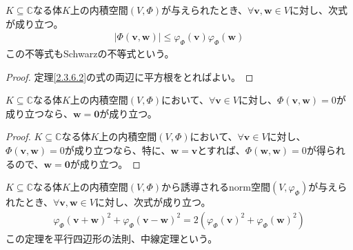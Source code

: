 \documentclass[dvipdfmx]{jsarticle}
\begin{document}
\begin{thm}[Schwarzの不等式の系]\label{2.3.6.4}
$K \subseteq \mathbb{C}$なる体$K$上の内積空間$(V,\varPhi)$が与えられたとき、$\forall\mathbf{v},\mathbf{w} \in V$に対し、次式が成り立つ。
\begin{align*}
\left| \varPhi\left( \mathbf{v},\mathbf{w} \right) \right| \leq \varphi_{\varPhi}\left( \mathbf{v} \right)\varphi_{\varPhi}\left( \mathbf{w} \right)
\end{align*}
この不等式もSchwarzの不等式という。
\end{thm}
\begin{proof} 定理\ref{2.3.6.2}の式の両辺に平方根をとればよい。
\end{proof}
\begin{thm}\label{2.3.6.5}
$K \subseteq \mathbb{C}$なる体$K$上の内積空間$(V,\varPhi)$において、$\forall\mathbf{v} \in V$に対し、$\varPhi\left( \mathbf{v},\mathbf{w} \right) = 0$が成り立つなら、$\mathbf{w} = \mathbf{0}$が成り立つ。
\end{thm}
\begin{proof}
$K \subseteq \mathbb{C}$なる体$K$上の内積空間$(V,\varPhi)$において、$\forall\mathbf{v} \in V$に対し、$\varPhi\left( \mathbf{v},\mathbf{w} \right) = 0$が成り立つなら、特に、$\mathbf{w} = \mathbf{v}$とすれば、$\varPhi\left( \mathbf{w},\mathbf{w} \right) = 0$が得られるので、$\mathbf{w} = \mathbf{0}$が成り立つ。
\end{proof}
\begin{thm}[中線定理]\label{2.3.6.6}
$K \subseteq \mathbb{C}$なる体$K$上の内積空間$(V,\varPhi)$から誘導されるnorm空間$\left( V,\varphi_{\varPhi} \right)$が与えられたとき、$\forall\mathbf{v},\mathbf{w} \in V$に対し、次式が成り立つ。
\begin{align*}
{\varphi_{\varPhi}\left( \mathbf{v} + \mathbf{w} \right)}^{2} + {\varphi_{\varPhi}\left( \mathbf{v} - \mathbf{w} \right)}^{2} = 2\left( {\varphi_{\varPhi}\left( \mathbf{v} \right)}^{2} + {\varphi_{\varPhi}\left( \mathbf{w} \right)}^{2} \right)
\end{align*}
この定理を平行四辺形の法則、中線定理という。
\end{thm}
\end{document}
